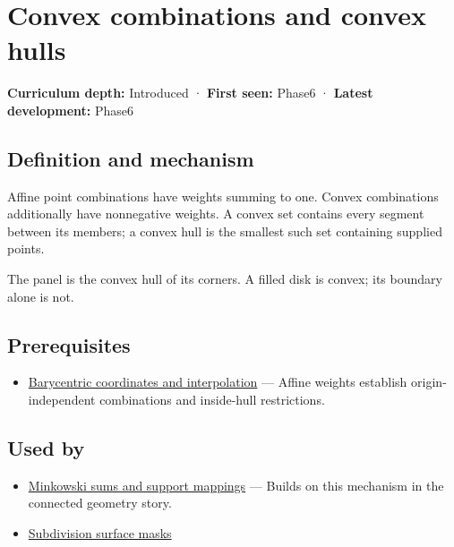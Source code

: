 \hypertarget{appendix-0026ec42c9d5}{}\label{referencestart:appendix-0026ec42c9d5}
\section{Convex combinations and convex hulls}\label{appendix-0026ec42c9d5-convex-combinations-and-convex-hulls}

\textbf{Curriculum depth:} Introduced · \textbf{First seen:} Phase6 · \textbf{Latest development:} Phase6

\subsection{Definition and mechanism}\label{appendix-0026ec42c9d5-definition-and-mechanism}

Affine point combinations have weights summing to one. Convex combinations additionally have nonnegative weights. A convex set contains every segment between its members; a convex hull is the smallest such set containing supplied points.

The panel is the convex hull of its corners. A filled disk is convex; its boundary alone is not.

\subsection{Prerequisites}\label{appendix-0026ec42c9d5-prerequisites}

\begin{itemize}
\tightlist
\item
  \hyperref[appendix-02b9d9a81dca]{Barycentric coordinates and interpolation} --- Affine weights establish origin-independent combinations and inside-hull restrictions.
\end{itemize}

\subsection{Used by}\label{appendix-0026ec42c9d5-used-by}

\begin{itemize}
\tightlist
\item
  \hyperref[appendix-215ac7099a82]{Minkowski sums and support mappings} --- Builds on this mechanism in the connected geometry story.
\item
  \hyperref[appendix-0234ab7f86b1]{Subdivision surface masks}
\end{itemize}

